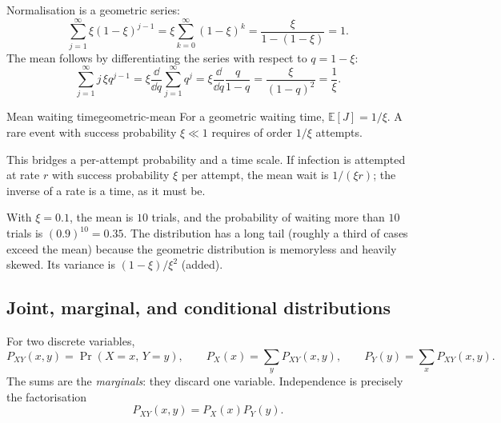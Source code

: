 Normalisation is a geometric series:
\begin{equation}\label{eq:lec02:geometric-norm}
\sum_{j=1}^{\infty}\xi(1-\xi)^{j-1}
=\xi\sum_{k=0}^{\infty}(1-\xi)^{k}
=\frac{\xi}{1-(1-\xi)}=1.
\end{equation}
The mean follows by differentiating the series with respect to $q=1-\xi$:
\begin{equation}\label{eq:lec02:geometric-mean}
\sum_{j=1}^{\infty}j\,\xi q^{j-1}
=\xi\frac{\dd}{\dd q}\sum_{j=1}^{\infty}q^{j}
=\xi\frac{\dd}{\dd q}\frac{q}{1-q}
=\frac{\xi}{(1-q)^2}
=\frac{1}{\xi}.
\end{equation}

\begin{proposition}[unbreakable]{Mean waiting time}{geometric-mean}
For a geometric waiting time, $\mathbb E[J]=1/\xi$. A rare event with success probability $\xi\ll1$ requires of order $1/\xi$ attempts.
\end{proposition}
This bridges a per-attempt probability and a time scale. If infection is attempted at rate $r$ with success probability $\xi$ per attempt, the mean wait is $1/(\xi r)$; the inverse of a rate is a time, as it must be.

\begin{remark}
With $\xi=0.1$, the mean is $10$ trials, and the probability of waiting more than $10$ trials is $(0.9)^{10}=0.35$. The distribution has a long tail (roughly a third of cases exceed the mean) because the geometric distribution is memoryless and heavily skewed. Its variance is $(1-\xi)/\xi^2$ (added).
\end{remark}

\subsection{Joint, marginal, and conditional distributions}\label{subsec:lec02:joint}
For two discrete variables,
\begin{equation}\label{eq:lec02:joint}
P_{XY}(x,y)=\Pr(X=x,\,Y=y),\qquad
P_X(x)=\sum_yP_{XY}(x,y),\qquad
P_Y(y)=\sum_xP_{XY}(x,y).
\end{equation}
The sums are the \emph{marginals}: they discard one variable. Independence is precisely the factorisation
\begin{equation}\label{eq:lec02:factorisation}
P_{XY}(x,y)=P_X(x)P_Y(y).
\end{equation}

